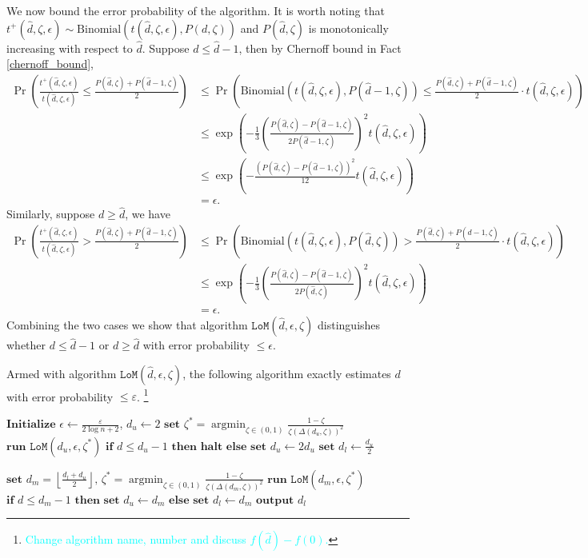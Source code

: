 \documentclass[onecolumn,letterpaper]{IEEEtran}
\DeclareMathOperator*{\argmin}{argmin}
\newcommand{\xw}[1]{\textcolor{cyan}{#1}}
\newcommand{\lom}{{\texttt{LoM}}}
\newcommand{\lomerr}{{\epsilon}}
\newcommand{\ud}{{\hat{d}}}
\newcommand{\lomp}{{P}}
\newcommand{\lomcp}{{\zeta}}
\newcommand{\lomrs}{{t(\ud,\lomcp,\lomerr)}}
\newcommand{\lompo}{{t^{+}(\ud,\lomcp,\lomerr)}}
\newcommand{\lomppd}{{\lomp(d,\lomcp)}}
\newcommand{\lompp}{{\lomp(\ud,\lomcp)}}
\newcommand{\lomppo}{{\lomp(\ud-1,\lomcp)}}
\newcommand{\esterr}{{\varepsilon}}
\newcommand{\dup}{{d_u}}
\newcommand{\dlw}{{d_l}}
\newcommand{\dmd}{{d_m}}
\newcommand{\lomcps}{{\lomcp^*}}
\newcommand{\lompgapup}{{\Delta(\dup,\lomcp)}}
\newcommand{\lompgapmd}{{\Delta(\dmd,\lomcp)}}
\begin{document}
\begin{IEEEproof}
    We now bound the error probability of the algorithm. It is worth noting that $\lompo \sim \text{Binomial} (\lomrs , \lomppd)$ and $\lompp$ is monotonically increasing with respect to $\ud$.  Suppose $d \le \ud-1$, then by Chernoff bound in Fact \ref{chernoff_bound},
    \begin{align*}
        \Pr \left( \frac{\lompo}{\lomrs} \le \frac{\lompp + \lomppo}{2} \right) &\le \Pr \left( \text{Binomial} (\lomrs , \lomppo) \le \frac{\lompp + \lomppo}{2} \cdot \lomrs \right) \\ 
        &\le \exp \left( -\frac{1}{3} \left( \frac{\lompp-\lomppo}{2\lomppo} \right)^2 \lomrs \right) \\ 
        &\le \exp \left( - \frac{(\lompp-\lomppo)^2}{12} \lomrs \right) \\ 
        &= \lomerr.
    \end{align*}
    Similarly, suppose $d \ge \ud$, we have 
    \begin{align*}
        \Pr \left( \frac{\lompo}{\lomrs} > \frac{\lompp + \lomppo}{2} \right) &\le \Pr \left( \text{Binomial} (\lomrs , \lompp) > \frac{\lompp + \lomppo}{2} \cdot \lomrs \right) \\ 
        &\le \exp \left( -\frac{1}{3} \left( \frac{\lompp-\lomppo}{2\lompp} \right)^2 \lomrs \right) \\ 
        &= \lomerr.
    \end{align*}
    Combining the two cases we show that algorithm $\lom(\ud,\lomerr,\lomcp)$ distinguishes whether $d \le \ud-1$ or $d \ge \ud$ with error probability $\le \lomerr$. 
\end{IEEEproof}


Armed with algorithm $\lom(\ud,\lomerr,\lomcp)$, the following algorithm exactly estimates $d$ with error probability $\le \esterr$. \footnote{\xw{Change algorithm name, number and discuss $f(\ud)-f(0)$.}}
\begin{algorithm} 
    \caption{Estimation of $d$}\label{algo:est}
    \begin{algorithmic}[1]
    \State $\textbf{Initialize } \lomerr \gets \frac{\esterr}{2\log n + 2}$, $\dup \gets 2$
        \State $\textbf{set } \lomcps = \argmin_{\lomcp\in(0,1)} \frac{1-\lomcp}{\lomcp (\lompgapup)^2}$
        \State $\textbf{run } \lom(\dup,\lomerr,\lomcps)$
        \State $\textbf{if } d \le \dup-1 \textbf{ then halt}$
        \State $\textbf{else set } \dup \gets 2\dup$
    \EndWhile
    \State $\textbf{set } \dlw \gets \frac{\dup}{2}$
    
    \While{$\dup - \dlw \ge 2$}
        \State $\textbf{set } \dmd = \left\lfloor \frac{\dlw+\dup}{2} \right\rfloor \text{, } \lomcps = \argmin_{\lomcp\in(0,1)} \frac{1-\lomcp}{\lomcp (\lompgapmd)^2}$
        \State $\textbf{run } \lom(\dmd,\lomerr,\lomcps)$
        \State $\textbf{if } d \le \dmd-1 \textbf{ then set } \dup \gets \dmd$
        \State $\textbf{else set } \dlw \gets \dmd$
    \EndWhile
    \State $\textbf{output } \dlw$
    \end{algorithmic}
\end{algorithm}
\end{document}
